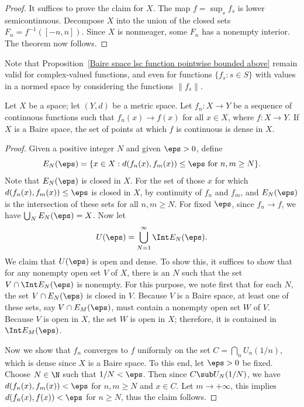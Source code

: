 \begin{proof}
It suffices to prove the claim for $X$. The map $f=\sup_sf_s$ is lower semicontinuous. Decompose $X$ into the union of the closed sets $F_n=f^{-1}([-n,n])$. Since $X$ is nonmeager, some $F_n$ has a nonempty interior. The theorem now follows.
\end{proof}
Note that Proposition~\ref{Baire space lsc function pointwise bounded above} remain valid for complex-valued functions, and even for functions $\{f_s:s\in S\}$ with values in a normed space by considering the functions $\|f_s\|$.
\begin{proposition}\label{Baire space limit of continuous function}
Let $X$ be a space; let $(Y,d)$ be a metric space. Let $f_n:X\to Y$ be a sequence of continuous functions such that $f_n(x)\to f(x)$ for all $x\in X$, where $f:X\to Y$. If $X$ is a Baire space, the set of points at which $f$ is continuous is dense in $X$.
\end{proposition}
\begin{proof}
Given a positive integer $N$ and given $\eps>0$, define
\[E_N(\eps)=\{x\in X:d(f_n(x),f_m(x))\leq\eps\text{ for $n,m\geq N$}\}.\]
Note that $E_N(\eps)$ is closed in $X$. For the set of those $x$ for which $d(f_n(x),f_m(x))\leq\eps$ is closed in $X$, by continuity of $f_n$ and $f_m$, and $E_N(\eps)$ is the intersection of these sets for all $n,m\geq N$. For fixed $\eps$, since $f_n\to f$, we have $\bigcup_NE_N(\eps)=X$. Now let
\[U(\eps)=\bigcup_{N=1}^{\infty}\Int E_N(\eps).\]
We claim that $U(\eps)$ is open and dense. To show this, it suffices to show that for any nonempty open set $V$ of $X$, there is an $N$ such that the set $V\cap\Int E_N(\eps)$ is nonempty. For this purpose, we note first that for each $N$, the set $V\cap E_N(\eps)$ is closed in $V$. Because $V$ is a Baire space, at least one of these sets, say $V\cap E_M(\eps)$, must contain a nonempty open set $W$ of $V$. Because $V$ is open in $X$, the set $W$ is open in $X$; therefore, it is contained in $\Int E_M(\eps)$.\par
Now we show that $f_n$ converges to $f$ uniformly on the set $C=\bigcap_nU_n(1/n)$, which is dense since $X$ is a Baire space. To this end, let $\eps>0$ be fixed. Choose $N\in\N$ such that $1/N<\eps$. Then since $C\sub U_N(1/N)$, we have $d(f_n(x),f_m(x))<\eps$ for $n,m\geq N$ and $x\in C$. Let $m\to+\infty$, this implies $d(f_n(x),f(x))<\eps$ for $n\geq N$, thus the claim follows.
\end{proof}
